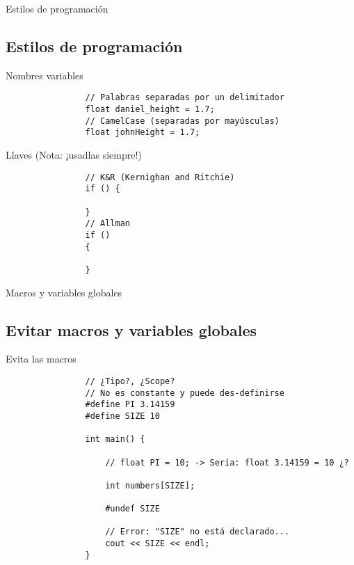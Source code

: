 \documentclass{beamer}
\newcommand{\normalSizeItem}[1] {
  \normalsize{\item #1}
}
\newcommand{\smallCite}[1]{
	\begin{small}
		\cite{#1}	
	\end{small}
}
\begin{document}
		\begin{frame}[fragile]{Estilos de programación}	
			\subsection{Estilos de programación}
			\begin{itemize}
			
				\normalSizeItem{Nombres variables \smallCite{namingConvention}}
				\begin{lstlisting}
				// Palabras separadas por un delimitador
				float daniel_height = 1.7;
				// CamelCase (separadas por mayúsculas)
				float johnHeight = 1.7;
				\end{lstlisting}
				
				\normalSizeItem{Llaves (Nota: ¡usadlas siempre!) \smallCite{indentationStyle}}
				\begin{lstlisting}
				// K&R (Kernighan and Ritchie)
				if () {
				
				}
				// Allman
				if ()
				{
				
				}
				\end{lstlisting}
				
			\end{itemize}
		\end{frame}
		
		\begin{frame}[fragile]{Macros y variables globales}	
			\subsection{Evitar macros y variables globales}
			\begin{itemize}
			
				\normalSizeItem{Evita las macros}
				\begin{lstlisting}
				// ¿Tipo?, ¿Scope?
				// No es constante y puede des-definirse
				#define PI 3.14159
				#define SIZE 10
				
				int main() {
					
					// float PI = 10; -> Sería: float 3.14159 = 10 ¿?
					
					int numbers[SIZE];
					
					#undef SIZE
					
					// Error: "SIZE" no está declarado...
					cout << SIZE << endl;
				}
				\end{lstlisting}
				
			\end{itemize}
		\end{frame}
		
\end{document}
